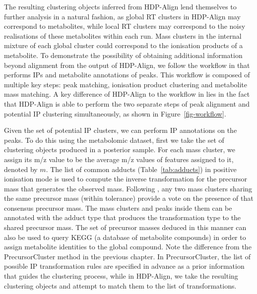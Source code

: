 The resulting clustering objects inferred from HDP-Align lend themselves to further analysis in a natural fashion, as global RT clusters in HDP-Align may correspond to metabolites, while local RT clusters may correspond to the noisy realisations of these metabolites within each run. Mass clusters in the internal mixture of each global cluster could correspond to the ionisation products of a metabolite. To demonstrate the possibility of obtaining additional information beyond alignment from the output of HDP-Align, we follow the workflow in \cite{Lee2013} that performs IPs and metabolite annotations of peaks. This workflow is composed of multiple key steps: peak matching, ionisation product clustering and metabolite mass matching. A key difference of HDP-Align to the workflow in \cite{Lee2013} lies in the fact that HDP-Align is able to perform the two separate steps of peak alignment and potential IP clustering simultaneously, as shown in Figure~\ref{fig-workflow}. 

Given the set of potential IP clusters, we can perform IP annotations on the peaks. To do this using the metabolomic dataset, first we take the set of clustering objects produced in a posterior sample. For each mass cluster, we assign its m/z value to be the average m/z values of features assigned to it, denoted by $m$. The list of common adducts (Table~\ref{tab:adducts}) in positive ionisation mode is used to compute the inverse transformation for the precursor mass that generates the observed mass. Following \cite{Lee2013}, any two mass clusters sharing the same precursor mass (within tolerance) provide a vote on the presence of that consensus precursor mass. The mass clusters and peaks inside them can be annotated with the adduct type that produces the transformation type to the shared precursor mass. The set of precursor masses deduced in this manner can also be used to query KEGG (a database of metabolite compounds) in order to assign metabolite identities to the global compound. Note the difference from the PrecursorCluster method in the previous chapter. In PrecursorCluster, the list of possible IP transformation rules are specified in advance as a prior information that guides the clustering process, while in HDP-Align, we take the resulting clustering objects and attempt to match them to the list of transformations.

